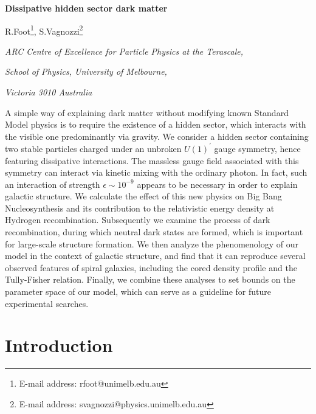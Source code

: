 \documentclass[12pt]{article}
\begin{document}

\renewcommand{\arraystretch}{2}

\begin{titlepage}
\vskip 2cm
\centerline{\Large \bf
Dissipative hidden sector dark matter}

\vskip 2.2cm
\centerline{\large R.Foot\footnote{E-mail address: rfoot@unimelb.edu.au}, S.Vagnozzi\footnote{
E-mail address: svagnozzi@physics.unimelb.edu.au}}


\vskip 0.7cm
\centerline{\it ARC Centre of Excellence for Particle Physics at the Terascale,}
\centerline{\it School of Physics, University of Melbourne,}
\centerline{\it Victoria 3010 Australia}
\vskip 2cm
\noindent

A simple way of explaining dark matter without modifying known Standard Model physics is to require the existence of a hidden sector, which interacts with the visible one predominantly via gravity. We consider a hidden sector containing two stable particles charged under an unbroken $U(1) ^{'}$ gauge symmetry, hence featuring dissipative interactions. The massless gauge field associated with this symmetry can interact via kinetic mixing with the ordinary photon. In fact, such an interaction of strength $\epsilon \sim 10 ^{-9}$ appears to be necessary in order to explain galactic structure. We calculate the effect of this new physics on Big Bang Nucleosynthesis and its contribution to the relativistic energy density at Hydrogen recombination. Subsequently we examine the process of dark recombination, during which neutral dark states are formed, which is important for large-scale structure formation. We then analyze the phenomenology of our model in the context of galactic structure, and find that it can reproduce several observed features of spiral galaxies, including the cored density profile and the Tully-Fisher relation. Finally, we combine these analyses to set bounds on the parameter space of our model, which can serve as a guideline for future experimental searches.

 \end{titlepage}
 
 \newpage

\section{Introduction}
\end{document}
